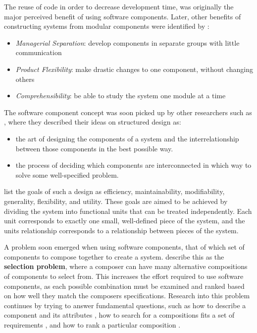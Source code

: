 The reuse of code in order to decrease development time, was originally the major perceived benefit of using software components.
Later, other benefits of constructing systems from modular components were identified by \cite{Parnas1972}:
\begin{itemize}
  \item \textit{Managerial Separation}: develop components in separate groups with little communication
  \item \textit{Product Flexibility}: make drastic changes to one component, without changing others
  \item \textit{Comprehensibility}: be able to study the system one module at a time
\end{itemize}

The software component concept was soon picked up by other researchers such as \cite{Yourdon1976}, where they described their ideas on structured design as:
\begin{itemize}
  \item the art of designing the components of a system and the interrelationship between those components in the best possible way.
  \item the process of deciding which components are interconnected in which way to solve some well-specified problem.
\end{itemize}
\cite{Yourdon1976} list the goals of such a design as efficiency, maintainability, modifiability, generality, flexibility, and utility.
These goals are aimed to be achieved by dividing the system into functional units that can be treated independently.
Each unit corresponds to exactly one small, well-defined piece of the system, and the units relationship corresponds to a relationship between pieces of the system.

A problem soon emerged when using software components, that of which set of components to compose together to create a system.
\cite{PrietoDiaz1987} describe this as the \textbf{selection problem}, where a composer can have many alternative compositions of components to select from.
This increases the effort required to use software components, as each possible combination must be examined and ranked based on how well they match the composers specifications.
Research into this problem continues by trying to answer fundamental questions, such as how to describe a component and its attributes \citep{treinen2009common,Xinjuan2007},
how to search for a compositions fits a set of requirements \citep{abate2011,Kwong2010,Treinen2009,DeAlmeida2004}, 
and how to rank a particular composition \citep{Chen2011,Aleti2009}.

